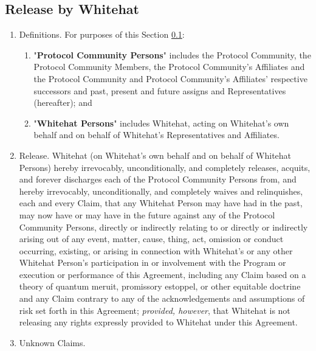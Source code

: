 \documentclass{article}
\begin{document}
\subsection{Release by Whitehat}\label{subsec:release_by_whitehat}

\begin{enumerate}[label=\Alph*.]

    \item Definitions. For purposes of this Section \ref{subsec:release_by_whitehat}:

          \begin{enumerate}
              \item "\textbf{Protocol Community Persons}" includes the Protocol Community, the Protocol Community Members, the Protocol Community's Affiliates and the Protocol Community and Protocol Community's Affiliates' respective successors and past, present and future assigns and Representatives (hereafter); and

              \item "\textbf{Whitehat Persons}" includes Whitehat, acting on Whitehat's own behalf and on behalf of Whitehat's Representatives and Affiliates.

          \end{enumerate}

    \item Release. Whitehat (on Whitehat's own behalf and on behalf of Whitehat Persons) hereby irrevocably, unconditionally, and completely releases, acquits, and forever discharges each of the Protocol Community Persons from, and hereby irrevocably, unconditionally, and completely waives and relinquishes, each and every Claim, that any Whitehat Person may have had in the past, may now have or may have in the future against any of the Protocol Community Persons, directly or indirectly relating to or directly or indirectly arising out of any event, matter, cause, thing, act, omission or conduct occurring, existing, or arising in connection with Whitehat's or any other Whitehat Person's participation in or involvement with the Program or execution or performance of this Agreement, including any Claim based on a theory of quantum meruit, promissory estoppel, or other equitable doctrine and any Claim contrary to any of the acknowledgements and assumptions of risk set forth in this Agreement; \textit{provided, however}, that Whitehat is not releasing any rights expressly provided to Whitehat under this Agreement.

    \item Unknown Claims.


\end{enumerate}
\end{document}
